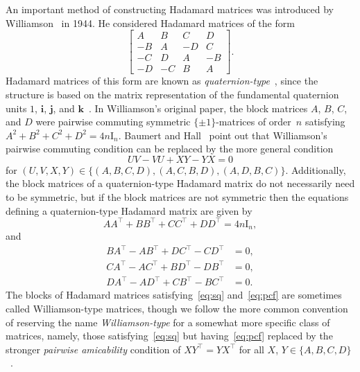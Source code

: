 \documentclass[12pt]{article}
\numberwithin{equation}{section}
\newcommand{\qi}{\mathbf{i}}
\newcommand{\qj}{\mathbf{j}}
\newcommand{\qk}{\mathbf{k}}
\newcommand{\id}{{\mathrm I}}
\begin{document}
An important method of constructing Hadamard matrices was introduced by Williamson~\cite{Williamson1944} in 1944.
He considered Hadamard matrices of the form
\[ \begin{bmatrix}
A & B & C & D \\
-B & A & -D & C \\
-C & D & A & -B \\
-D & -C & B & A
\end{bmatrix} . \]
Hadamard matrices of this form are known as \emph{quaternion-type}~\cite{Baumert1965}, since the structure is based on the matrix representation
of the fundamental quaternion units $1$, $\qi$, $\qj$, and $\qk$~\cite{hamilton}.
In Williamson's original paper, the block matrices $A$, $B$, $C$, and $D$ were pairwise commuting symmetric
$\{\pm1\}$-matrices of order~$n$ satisfying $A^2 + B^2 + C^2 + D^2 = 4n \id_n$.
Baumert and Hall~\cite{Baumert1965} point out that Williamson's pairwise commuting condition can be replaced by the
more general condition
\[ UV - VU + XY - YX = 0 \]
for $(U,V,X,Y)\in\{(A,B,C,D),(A,C,B,D),(A,D,B,C)\}$.
Additionally, the block matrices of a quaternion-type Hadamard matrix do not necessarily need to be symmetric,
but if the block matrices are not symmetric then the equations defining a quaternion-type Hadamard matrix
are given by
\begin{equation} AA^\top + BB^\top + CC^\top + DD^\top = 4n\id_n , \label{eq:sq} \end{equation}
and
\begin{equation}
\begin{split}
BA^\top  - AB^\top  + DC^\top  - CD^\top  &= 0, \\
CA^\top  - AC^\top  + BD^\top  - DB^\top  &= 0, \\
DA^\top  - AD^\top  + CB^\top  - BC^\top  &= 0.
\end{split}\label{eq:pcf}
\end{equation}
The blocks of Hadamard matrices satisfying~\eqref{eq:sq} and~\eqref{eq:pcf} are sometimes
called Williamson-type matrices, though we follow the more common convention of reserving
the name \emph{Williamson-type} for a somewhat more specific class of matrices,
namely, those satisfying~\eqref{eq:sq}
but having~\eqref{eq:pcf} replaced by the stronger \emph{pairwise amicability} condition
of $XY^\top = YX^\top$ for all $X$, $Y \in \{A,B,C,D\}$~\cite{SeberryWallis1975}.
\end{document}
